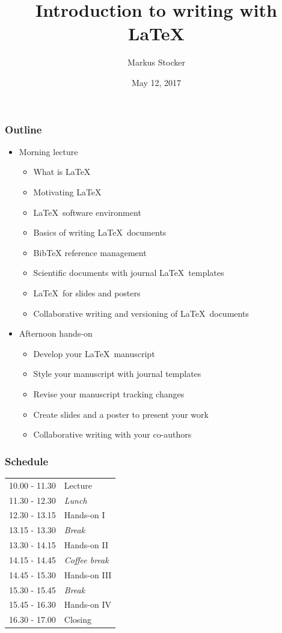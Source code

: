 \documentclass{beamer}
\title{Introduction to writing with LaTeX}
\author{Markus Stocker}
\date{May 12, 2017}
\begin{document}
\maketitle

\begin{frame}
  \frametitle{Outline}
  
  \begin{itemize}
  \item Morning lecture
  \begin{itemize}
  \item What is \LaTeX
  \item Motivating \LaTeX 
  \item \LaTeX~software environment
  \item Basics of writing \LaTeX~documents
  \item BibTeX reference management
  \item Scientific documents with journal \LaTeX~templates
  \item \LaTeX~for slides and posters
  \item Collaborative writing and versioning of \LaTeX~documents
  \end{itemize}
  \item Afternoon hands-on
  \begin{itemize}
  \item Develop your \LaTeX~manuscript
  \item Style your manuscript with journal templates
  \item Revise your manuscript tracking changes
  \item Create slides and a poster to present your work
  \item Collaborative writing with your co-authors
  \end{itemize}
  \end{itemize}
\end{frame}

\begin{frame}
  \frametitle{Schedule}
  
  \begin{center}
  \begin{tabular}{ll}
  10.00 - 11.30 & Lecture \\
  11.30 - 12.30 & \emph{Lunch} \\
  12.30 - 13.15 & Hands-on I \\
  13.15 - 13.30 & \emph{Break} \\
  13.30 - 14.15 & Hands-on II \\
  14.15 - 14.45 & \emph{Coffee break} \\
  14.45 - 15.30 & Hands-on III \\
  15.30 - 15.45 & \emph{Break} \\
  15.45 - 16.30 & Hands-on IV \\
  16.30 - 17.00 & Closing
  \end{tabular}
  \end{center}
\end{frame}
\end{document}
